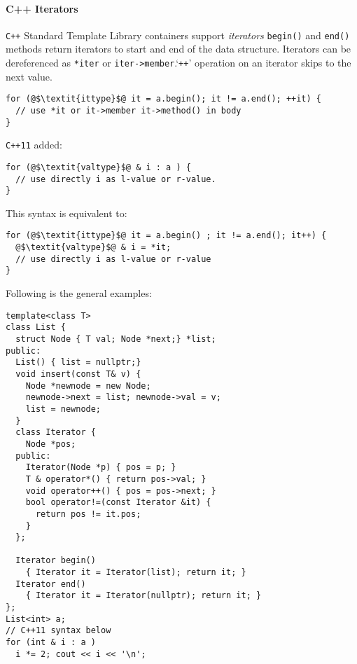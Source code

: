 \paragraph{C++ Iterators}
\texttt{C++} Standard Template Library containers support \textit{iterators} \texttt{begin()} and \texttt{end()} methods return iterators to start and end of the data structure. Iterators can be dereferenced as \texttt{*iter} or \texttt{iter->member}.`\texttt{++}' operation on an iterator skips to the next value.
\begin{listing}[H]
\begin{verbatim}
for (@$\textit{ittype}$@ it = a.begin(); it != a.end(); ++it) {
  // use *it or it->member it->method() in body
}
\end{verbatim}
\end{listing}
\texttt{C++11} added:
\begin{listing}[H]
\begin{verbatim}
for (@$\textit{valtype}$@ & i : a ) {
  // use directly i as l-value or r-value. 
}
\end{verbatim}
\end{listing}
This syntax is equivalent to:
\begin{listing}[H]
\begin{verbatim}
for (@$\textit{ittype}$@ it = a.begin() ; it != a.end(); it++) {
  @$\textit{valtype}$@ & i = *it;
  // use directly i as l-value or r-value 
}
\end{verbatim}
\end{listing}
Following is the general examples:
\begin{listing}[H]

\begin{verbatim}
template<class T>
class List {
  struct Node { T val; Node *next;} *list;
public:
  List() { list = nullptr;}
  void insert(const T& v) { 
    Node *newnode = new Node;
    newnode->next = list; newnode->val = v; 
    list = newnode;
  }
  class Iterator {
    Node *pos;
  public: 
    Iterator(Node *p) { pos = p; }
    T & operator*() { return pos->val; }
    void operator++() { pos = pos->next; }
    bool operator!=(const Iterator &it) { 
      return pos != it.pos;
    }
  };
  
  Iterator begin() 
    { Iterator it = Iterator(list); return it; }
  Iterator end()
    { Iterator it = Iterator(nullptr); return it; }
};
List<int> a;
// C++11 syntax below
for (int & i : a )
  i *= 2; cout << i << '\n';
\end{verbatim}
\caption{}
\label{code:code5}
\end{listing}

